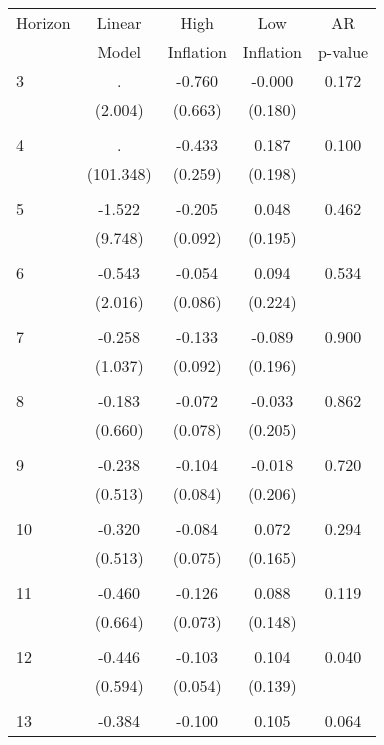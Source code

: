 \begin{tabular}{l*{1}{cccc}}
\hline\hline
 Horizon  & Linear & High                 & Low           & AR            \\
                  & Model         & Inflation & Inflation & p-value       \\
\hline
   3       &     . & -0.760 & -0.000 & 0.172 \\
          & (2.004) & (0.663) & (0.180) & \\
 & & & &\\
   4       &     . & -0.433 & 0.187 & 0.100 \\
          & (101.348) & (0.259) & (0.198) & \\
 & & & &\\
   5       & -1.522 & -0.205 & 0.048 & 0.462 \\
          & (9.748) & (0.092) & (0.195) & \\
 & & & &\\
   6       & -0.543 & -0.054 & 0.094 & 0.534 \\
          & (2.016) & (0.086) & (0.224) & \\
 & & & &\\
   7       & -0.258 & -0.133 & -0.089 & 0.900 \\
          & (1.037) & (0.092) & (0.196) & \\
 & & & &\\
   8       & -0.183 & -0.072 & -0.033 & 0.862 \\
          & (0.660) & (0.078) & (0.205) & \\
 & & & &\\
   9       & -0.238 & -0.104 & -0.018 & 0.720 \\
          & (0.513) & (0.084) & (0.206) & \\
 & & & &\\
  10       & -0.320 & -0.084 & 0.072 & 0.294 \\
          & (0.513) & (0.075) & (0.165) & \\
 & & & &\\
  11       & -0.460 & -0.126 & 0.088 & 0.119 \\
          & (0.664) & (0.073) & (0.148) & \\
 & & & &\\
  12       & -0.446 & -0.103 & 0.104 & 0.040 \\
          & (0.594) & (0.054) & (0.139) & \\
 & & & &\\
  13       & -0.384 & -0.100 & 0.105 & 0.064 \\

\end{tabular}
